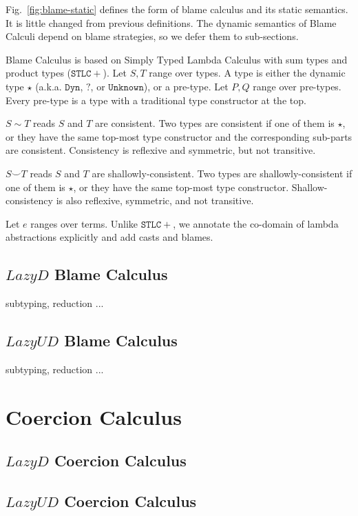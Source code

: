 \documentclass[acmsmall,review,anonymous]{acmart}\settopmatter{printfolios=true,printccs=false,printacmref=false}
\newcommand{\figref}[1]{Fig.~\ref{#1}}
\begin{document}
\figref{fig:blame-static} defines the form of blame calculus and its static 
semantics. It is little changed from previous definitions. 
The dynamic semantics of Blame Calculi depend on blame strategies, so we defer 
them to sub-sections.

Blame Calculus is based on Simply Typed Lambda Calculus with sum types and 
product types ($ \mathtt{STLC+} $). 
Let $ S,T $ range over types. A type is either the dynamic type $ \star $
(a.k.a. $ \mathtt{Dyn} $, $ \mathbb{?} $, or $ \mathtt{Unknown} $), 
or a pre-type. 
Let $ P,Q $ range over pre-types. Every pre-type is a type with a 
traditional type constructor at the top.

$ S \sim T $ reads $ S $ and $ T $ are consistent. Two types are consistent if 
one of them is $ \star $, or they have the same top-most type constructor and 
the corresponding sub-parts are consistent. Consistency is reflexive and 
symmetric, but not transitive.

$ S \smile T $ reads $ S $ and $ T $ are shallowly-consistent. Two types are 
shallowly-consistent if one of them is $ \star $, or they have the same 
top-most type constructor. 
Shallow-consistency is also reflexive, symmetric, and not transitive.

Let $ e $ ranges over terms. Unlike $ \mathtt{STLC+} $, we annotate the 
co-domain of lambda abstractions explicitly and add casts and blames.

\subsection{$Lazy D$ Blame Calculus}

subtyping, reduction ...

\subsection{$Lazy UD$ Blame Calculus}

subtyping, reduction ...

\section{Coercion Calculus}

\subsection{$Lazy D$ Coercion Calculus}

\subsection{$Lazy UD$ Coercion Calculus}
\end{document}
